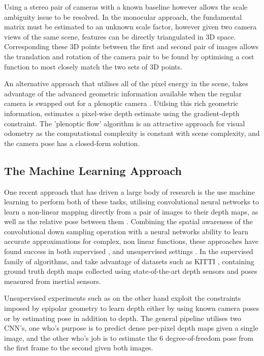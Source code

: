\documentclass[openany]{book}
\begin{document}
Using a stereo pair of cameras with a known baseline however allows the scale ambiguity issue to be resolved. In the monocular approach, the fundamental matrix must be estimated to an unknown scale factor, however given two camera views of the same scene, features can be directly triangulated in 3D space. Corresponding these 3D points between the first and second pair of images allows the translation and rotation of the camera pair to be found by optimising a cost function to most closely match the two sets of 3D points. 

An alternative approach that utilises all of the pixel energy in the scene, takes advantage of the advanced geometric information available when the regular camera is swapped out for a plenoptic camera \cite{dansereau2011plenopticflow}. Utilsing this rich geometric information, \cite{dansereau2011plenopticflow} estimates a pixel-wise depth estimate using the gradient-depth constraint. The 'plenoptic flow' algorithm is an attractive approach for visual odometry as the computational complexity is constant with scene complexity, and the camera pose has a closed-form solution. 

\subsection{The Machine Learning Approach}

One recent approach that has driven a large body of research is the use machine learning to perform both of these tasks, utilising convolutional neural networks to learn a non-linear mapping directly from a pair of images to their depth maps, as well as the relative pose between them \cite{eigen2014supervised, garg2016unsupervised,godard2016consistency, liu2015supervised, zhou2017unsupervised}. Combining the spatial awareness of the convolutional down sampling operation with a neural networks ability to learn accurate approximations for complex, non linear functions, these approaches have found success in both supervised \cite{liu2015supervised, eigen2014supervised}, and unsupervised settings \cite{garg2016unsupervised, godard2016consistency, zhou2017unsupervised}. In the supervised family of algorithms, \cite{eigen2014supervised} and \cite{liu2015supervised} take advantage of datasets such as KITTI \cite{dataset-kitti}, containing ground truth depth maps collected using state-of-the-art depth sensors and poses measured from inertial sensors. 

Unsupervised experiments such as \cite{garg2016unsupervised, godard2016consistency,zhou2017unsupervised} on the other hand exploit the constraints imposed by epipolar geometry to learn depth either by using known camera poses or by estimating pose in addition to depth. The general pipeline utilises two CNN's, one who's purpose is to predict dense per-pixel depth maps given a single image, and the other who's job is to estimate the 6 degree-of-freedom pose from the first frame to the second given both images.
\end{document}
